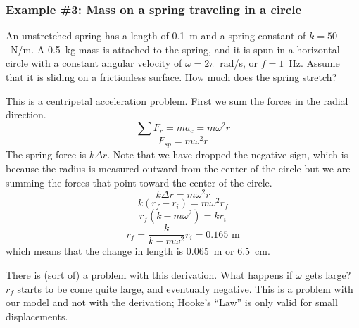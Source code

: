 \subsubsection*{Example \#3: Mass on a spring traveling in a circle}
An unstretched spring has a length of 0.1~m and a spring constant of $k=50$~N/m. A 0.5~kg mass is attached to the spring, and it is spun in a horizontal circle with a constant angular velocity of $\omega = 2\pi$~rad/s, or $f=1$~Hz. Assume that it is sliding on a frictionless surface. How much does the spring stretch?

\vspace{4cm}

This is a centripetal acceleration problem. First we sum the forces in the radial direction.
$$\sum F_r = ma_c = m\omega^2 r$$
$$F_{sp} = m\omega^2 r$$
The spring force is $k\Delta r$. Note that we have dropped the negative sign, which is because the radius is measured outward from the center of the circle but we are summing the forces that point toward the center of the circle.
$$k\Delta r = m\omega^2r$$
$$k(r_f-r_i) = m\omega^2r_f$$
$$r_f(k-m\omega^2) = kr_i$$
$$r_f = \frac{k}{k-m\omega^2}r_i = 0.165\mbox{ m}$$
which means that the change in length is 0.065~m or 6.5~cm.

There is (sort of) a problem with this derivation. What happens if $\omega$ gets large? $r_f$ starts to be come quite large, and eventually negative. This is a problem with our model and not with the derivation; Hooke's ``Law'' is only valid for small displacements.

\clearpage
